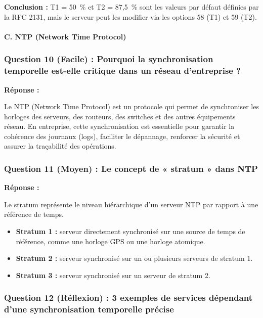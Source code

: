 \documentclass[12pt,a4paper]{article}
\newcommand{\reponse}{\textbf{Réponse :}\par}
\begin{document}
\textbf{Conclusion :} T1 = 50~\% et T2 = 87,5~\% sont les valeurs par
défaut définies par la RFC 2131, mais le serveur peut les modifier via
les options 58 (T1) et 59 (T2).

\paragraph{C. NTP (Network Time Protocol)}

\subsubsection*{Question 10 (Facile) : Pourquoi la synchronisation temporelle est-elle critique dans un réseau d'entreprise ?}

\reponse
Le NTP (Network Time Protocol) est un protocole qui permet de
synchroniser les horloges des serveurs, des routeurs, des switches et
des autres équipements réseau. En entreprise, cette synchronisation est
essentielle pour garantir la cohérence des journaux (logs), faciliter le
dépannage, renforcer la sécurité et assurer la traçabilité des
opérations.

\subsubsection*{Question 11 (Moyen) : Le concept de « stratum » dans NTP}

\reponse
Le stratum représente le niveau hiérarchique d'un serveur NTP par
rapport à une référence de temps.
\begin{itemize}
    \item \textbf{Stratum 1 :} serveur directement synchronisé sur une
    source de temps de référence, comme une horloge GPS ou une horloge
    atomique.
    \item \textbf{Stratum 2 :} serveur synchronisé sur un ou plusieurs
    serveurs de stratum 1.
    \item \textbf{Stratum 3 :} serveur synchronisé sur un serveur de
    stratum 2.
\end{itemize}

\subsubsection*{Question 12 (Réflexion) : 3 exemples de services dépendant d'une synchronisation temporelle précise}
\end{document}
